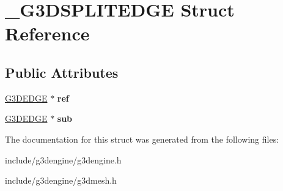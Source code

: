 \hypertarget{struct__G3DSPLITEDGE}{}\section{\+\_\+\+G3\+D\+S\+P\+L\+I\+T\+E\+D\+GE Struct Reference}
\label{struct__G3DSPLITEDGE}
\subsection*{Public Attributes}
\begin{DoxyCompactItemize}
\item 
\mbox{\label{struct__G3DSPLITEDGE_a126f8675abae0e06ee1cac2d82b677df}} 
\hyperlink{struct__G3DEDGE}{G3\+D\+E\+D\+GE} $\ast$ {\bfseries ref}
\item 
\mbox{\label{struct__G3DSPLITEDGE_a4b06b8c44ad0cf371ffe374649c3c8ed}} 
\hyperlink{struct__G3DEDGE}{G3\+D\+E\+D\+GE} $\ast$ {\bfseries sub}
\end{DoxyCompactItemize}


The documentation for this struct was generated from the following files\+:\begin{DoxyCompactItemize}
\item 
include/g3dengine/g3dengine.\+h\item 
include/g3dengine/g3dmesh.\+h\end{DoxyCompactItemize}
